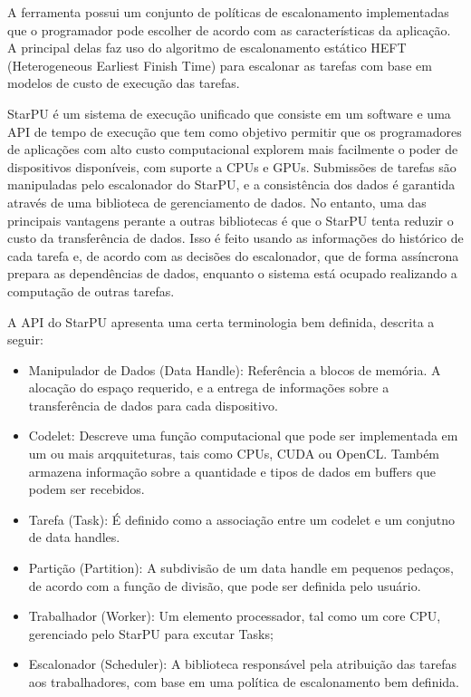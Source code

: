 A ferramenta possui um conjunto de políticas de escalonamento implementadas que o programador pode escolher de acordo com as características da aplicação. A principal delas faz uso do algoritmo de escalonamento estático HEFT (Heterogeneous Earliest Finish Time) para escalonar as tarefas com base em modelos de custo de execução das tarefas.

StarPU é um sistema de execução unificado que consiste em um software e uma API de tempo de execução que tem como objetivo permitir que os programadores de aplicações com alto custo  computacional explorem mais facilmente o poder de dispositivos disponíveis, com suporte a CPUs e GPUs. Submissões de tarefas são manipuladas pelo escalonador do StarPU, e a consistência dos dados é garantida através de uma biblioteca de gerenciamento de dados. 
No entanto, uma das principais vantagens perante a outras bibliotecas é que o StarPU tenta reduzir o custo da transferência de dados. Isso é feito usando as informações do histórico de cada tarefa e, de acordo com as decisões do escalonador, que de forma assíncrona prepara as dependências de dados, enquanto o sistema está ocupado realizando a computação de outras tarefas. 

A API do StarPU apresenta uma certa terminologia bem definida, descrita a seguir:

\begin{itemize}
	\item Manipulador de Dados (Data Handle): Referência a blocos de memória. A alocação do espaço requerido, e a entrega de informações sobre a transferência de dados para cada dispositivo.
	\item Codelet: Descreve uma função computacional que pode ser implementada em um ou mais arqquiteturas, tais como CPUs, CUDA ou OpenCL. Também armazena informação sobre a quantidade e tipos de dados em buffers que podem ser recebidos.
	\item Tarefa (Task): É definido como a  associação entre um codelet e um conjutno de data handles.
	\item Partição (Partition): A subdivisão de um data handle em pequenos pedaços, de acordo com a função de divisão, que pode ser definida pelo usuário.
	\item Trabalhador (Worker): Um elemento processador, tal como um core CPU, gerenciado pelo StarPU para excutar Tasks;
	\item Escalonador (Scheduler): A biblioteca responsável pela atribuição das tarefas aos trabalhadores, com base em uma política de escalonamento bem definida.

\end{itemize}


